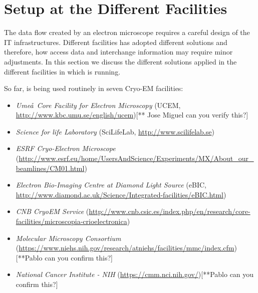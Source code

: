 \section{\scipion Setup at the Different Facilities}

The data flow created by an electron microscope requires a careful design of the IT infrastructures.  Different facilities has adopted different solutions and therefore, how \scipion  access data and interchange information may require minor adjustments. In this section we discuss  the different solutions applied in the different facilities in which \scipion is running.

So far, \scipion is being used routinely in seven Cryo-EM facilities:
\begin{itemize}
 \itemsep0em 

 \item \emph{Ume\aa\ Core Facility for Electron Microscopy} (UCEM, \url{http://www.kbc.umu.se/english/ucem})[** Jose Miguel can you verify this?] 
 \item \emph{Science for life Laboratory} (SciLifeLab, \url{http://www.scilifelab.se})
 \item \emph{ESRF Cryo-Electron Microscope} (\url{http://www.esrf.eu/home/UsersAndScience/Experiments/MX/About_our_beamlines/CM01.html})
 \item \emph{Electron Bio-Imaging Centre at Diamond Light Source} (eBIC, \url{http://www.diamond.ac.uk/Science/Integrated-facilities/eBIC.html})
 \item \emph{CNB CryoEM Service} (\url{http://www.cnb.csic.es/index.php/en/research/core-facilities/microscopia-crioelectronica})
 \item \emph{Molecular Microscopy Consortium} (\url{https://www.niehs.nih.gov/research/atniehs/facilities/mmc/index.cfm})[**Pablo can you confirm this?]
 \item \emph{National Cancer Institute - NIH} (\url{https://cmm.nci.nih.gov/})[**Pablo can you confirm this?]
 
 

\end{itemize}


